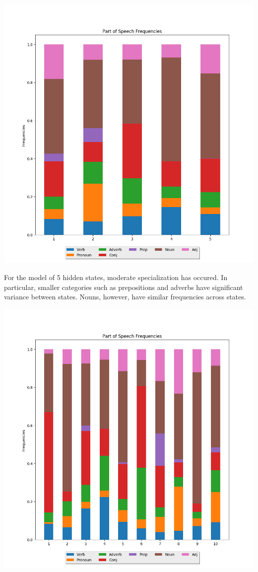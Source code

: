 \begin{center}
\includegraphics[scale=0.6]{../src/results/parts_of_speech_5}
\end{center}

For the model of 5 hidden states, moderate specialization has occured. In particular, smaller categories such as prepositions and adverbs have significant variance between states. Nouns, however, have similar frequencies across states.

\begin{center}
\includegraphics[scale=0.6]{../src/results/parts_of_speech_10}
\end{center}

